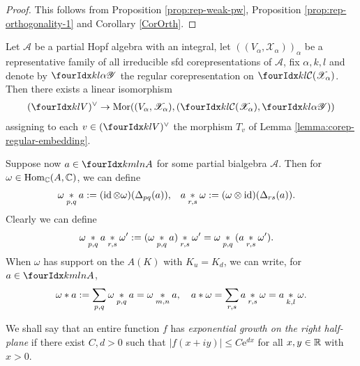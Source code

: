 \begin{proof} This follows from Proposition \ref{prop:rep-weak-pw}, Proposition \ref{prop:rep-orthogonality-1} and Corollary \ref{CorOrth}.
\end{proof}
\begin{Cor}
  Let $\mathscr{A}$ be a partial Hopf algebra with an integral, let
  $((V_{\alpha},\mathscr{X}_{\alpha}))_{\alpha}$ be a representative
  family of all irreducible sfd corepresentations of $\mathscr{A}$,
  fix $\alpha,k,l$ and denote by $\Gr{\mathscr{Y}}{k}{l}{}{\alpha}$
  the regular corepresentation on
  $\Gru{\mathcal{C}(\mathscr{X}_{\alpha})}{k}{l}$. Then there exists a
  linear isomorphism
  \begin{align*}
    \dual{( \Gru{V}{k}{l})} \to
    \Mor((V_{\alpha},\mathscr{X}_{\alpha}),
    (\Gru{\mathcal{C}(\mathscr{X}_{\alpha})}{k}{l},\Gr{\mathscr{Y}}{k}{l}{}{\alpha}))
  \end{align*}
  assigning to each $v\in     \dual{( \Gru{V}{k}{l})}$ the morphism
  $T_{v}$ of Lemma \ref{lemma:corep-regular-embedding}.
\end{Cor}


Suppose now $a\in \Gr{A}{k}{l}{m}{n}$ for some partial bialgebra $\mathscr{A}$. Then for $\omega \in \operatorname{Hom}_{\mathbb{C}}(A,\mathbb{C})$, we can define
\begin{align*}
  \omega \underset{p,q}{\ast} a
&:= (\operatorname{id} \otimes \omega) (\Delta_{pq}(a)), & a \underset{r,s}{\ast}
\omega&:=(\omega \otimes \operatorname{id})(\Delta_{rs}(a)).\end{align*} Clearly we can define
\begin{align*} \omega \underset{p,q}{\ast} a \underset{r,s}{\ast}
\omega'&:= (\omega \underset{p,q}{\ast} a)\underset{r,s}{\ast} \omega' = \omega \underset{p,q}{\ast}(a \underset{r,s}{\ast} \omega').\end{align*}
When $\omega$ has support on the $A(K)$ with $K_u=K_d$, we can write, for $a\in \Gr{A}{k}{l}{m}{n}$, \[\omega\ast a := \sum_{p,q} \omega\underset{p,q}{\ast}a = \omega\underset{m,n}{\ast}a,\quad  a\ast \omega = \sum_{r,s} a\underset{r,s}{\ast}\omega = a\underset{k,l}{\ast}\omega.\] 

We shall say that an entire function $f$ has \emph{exponential growth
  on the right half-plane} if there exist $C,d>0$ such that $|f(x+iy)|\leq
C\mathrm{e}^{dx}$  for all $x,y\in \mathbb{R}$ with $x>0$. 

